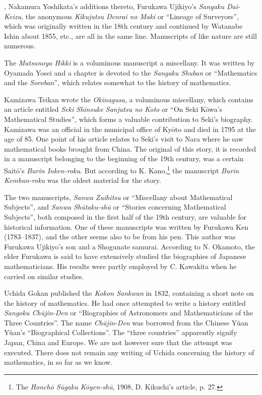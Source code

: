 \documentclass[11pt]{article}
\newcommand{\scanpage}[2]{\clearpage\setcounter{footnote}{0}\noindent{\footnotesize\color{gray}PDF page #1 · #2}\par\medskip}
\begin{document}
\scanpage{0339}{printed page 325}
, Nakamura Yoshikata's additions thereto, Furukawa Ujikiyo's \emph{Sangaku Dai-Keizu}, the anonymous \emph{Kikujutsu Denrai no Maki} or ``Lineage of Surveyors'', which was originally written in the 18th century and continued by Watanabe Ishin about 1855, etc., are all in the same line. Manuscripts of like nature are still numerous.

The \emph{Matsunoya Hikki} is a voluminous manuscript a miscellany. It was written by Oyamada Yosei and a chapter is devoted to the \emph{Sangaku Shuban} or ``Mathematics and the \emph{Soroban}'', which relates somewhat to the history of mathematics.

Kamizawa Teikan wrote the \emph{Okinagusa}, a voluminous miscellany, which contains an article entitled \emph{Seki Shinsuke Sanjutsu no Koto} or ``On Seki Kōwa's Mathematical Studies'', which forms a valuable contribution to Seki's biography. Kamizawa was an official in the municipal office of Kyōto and died in 1795 at the age of 85. One point of his article relates to Seki's visit to Nara where he saw mathematical books brought from China. The original of this story, it is recorded in a manuscript belonging to the beginning of the 19th century, was a certain Saitō's \emph{Burin Inken-roku}. But according to K. Kano,\footnote{The \emph{Honchō Sūgaku Kōyen-shū}, 1908, D. Kikuchi's article, p. 27.} the manuscript \emph{Burin Kembun-roku} was the oldest material for the story.

The two manuscripts, \emph{Sanwa Zuihitsu} or ``Miscellany about Mathematical Subjects'', and \emph{Sanwa Shūtaku-shū} or ``Stories concerning Mathematical Subjects'', both composed in the first half of the 19th century, are valuable for historical information. One of these manuscripts was written by Furukawa Ken (1783--1837), and the other seems also to be from his pen. This author was Furukawa Ujikiyo's son and a Shogunate samurai. According to N. Okamoto, the elder Furukawa is said to have extensively studied the biographies of Japanese mathematicians. His results were partly employed by C. Kawakita when he carried on similar studies.

Uchida Gokan published the \emph{Kokon Sankwan} in 1832, containing a short note on the history of mathematics. He had once attempted to write a history entitled \emph{Sangoku Chūjin-Den} or ``Biographies of Astronomers and Mathematicians of the Three Countries''. The name \emph{Chūjin-Den} was borrowed from the Chinese Yüan Yüan's ``Biographical Collections''. The ``three countries'' apparently signify Japan, China and Europe. We are not however sure that the attempt was executed. There does not remain any writing of Uchida concerning the history of mathematics, in so far as we know.
\end{document}
